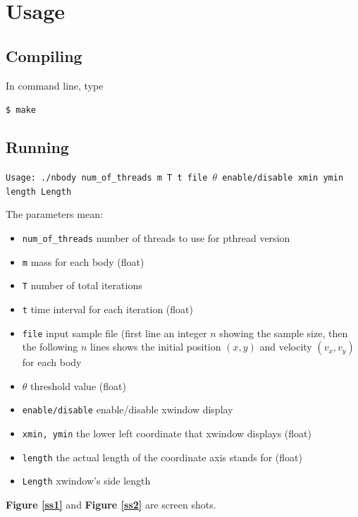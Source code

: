 \documentclass[11pt, a4paper]{article}
\newcommand{\fref}[1]{\textbf{Figure \ref{#1}}}
\begin{document}
\section{Usage}

\subsection{Compiling}

In command line, type

\texttt{\$ make}

\subsection{Running}

\texttt{Usage: ./nbody num\_of\_threads m T t file $\theta$ enable/disable xmin ymin length Length}

The parameters mean:

\begin{itemize}
    \item \texttt{num\_of\_threads} number of threads to use for pthread version
    \item \texttt{m} mass for each body (float)
    \item \texttt{T} number of total iterations
    \item \texttt{t} time interval for each iteration (float)
    \item \texttt{file} input sample file (first line an integer $n$ showing the sample size, then the following $n$ lines shows the initial position $(x, y)$ and velocity $(v_x, v_y)$ for each body
    \item \texttt{$\theta$} threshold value (float)
    \item \texttt{enable/disable} enable/disable xwindow display
    \item \texttt{xmin, ymin} the lower left coordinate that xwindow displays (float)
    \item \texttt{length} the actual length of the coordinate axis stands for (float)
    \item \texttt{Length} xwindow's side length
\end{itemize}

\fref{ss1} and \fref{ss2} are screen shots.
\end{document}
